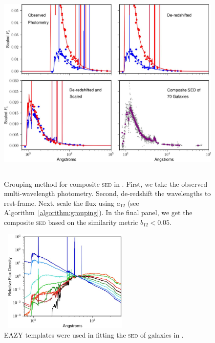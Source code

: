\documentclass{ar-1col}
\begin{document}
\begin{figure}
    \includegraphics[width=5in, height=4in]{images/grouping.png}
    \caption{Grouping method for composite \textsc{sed} in \citet{Forrest2018}. First, we take the observed multi-wavelength photometry. Second, de-redshift the wavelengths to rest-frame. Next, scale the flux using $a_{12}$ (see Algorithm~\ref{algorithm:grouping}). In the final panel, we get the composite \textsc{sed} based on the similarity metric $b_{12} < 0.05$.}
    \label{fig:grouping}
\end{figure}
 
 
\begin{figure}
    \includegraphics[width=2.6in, height=2in]{images/EAZY.png}
    \caption{EAZY \citep{Brammer2008} templates were used in fitting the \textsc{sed} of galaxies in \citet{Forrest2018}.}
    \label{fig:EAZY}
\end{figure}
\end{document}
